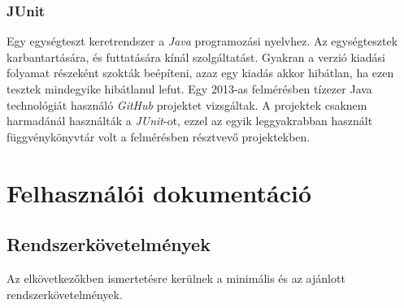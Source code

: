 \documentclass{elteikthesis}
\begin{document}
\subsection{JUnit}
Egy egységteszt keretrendszer a \emph{Java} programozási nyelvhez. Az egységtesztek karbantartására, és futtatására kínál szolgáltatást. Gyakran a verzió kiadási folyamat részeként szokták beépíteni, azaz egy kiadás akkor hibátlan, ha ezen tesztek mindegyike hibátlanul lefut. Egy 2013-as felmérésben\cite{Survey} tízezer Java technológiát használó \emph{GitHub} projektet vizsgáltak. A projektek csaknem harmadánál használták a \emph{JUnit}-ot, ezzel az egyik leggyakrabban használt függvénykönyvtár volt a felmérésben résztvevő projektekben.

\chapter{Felhasználói dokumentáció}
\section{Rendszerkövetelmények}
Az elkövetkezőkben ismertetésre kerülnek a minimális és az ajánlott rendszerkövetelmények.
\end{document}
